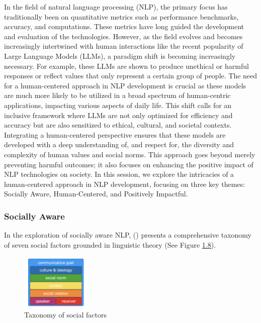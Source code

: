 \documentclass[
  letterpaper,
  DIV=11,
  numbers=noendperiod,
  oneside]{scrreprt}
\theoremstyle{remark}
\begin{document}
In the field of natural language processing (NLP), the primary focus has
traditionally been on quantitative metrics such as performance
benchmarks, accuracy, and computations. These metrics have long guided
the development and evaluation of the technologies. However, as the
field evolves and becomes increasingly intertwined with human
interactions like the recent popularity of Large Language Models (LLMs),
a paradigm shift is becoming increasingly necessary. For example, these
LLMs are shown to produce unethical or harmful responses or reflect
values that only represent a certain group of people. The need for a
human-centered approach in NLP development is crucial as these models
are much more likely to be utilized in a broad spectrum of human-centric
applications, impacting various aspects of daily life. This shift calls
for an inclusive framework where LLMs are not only optimized for
efficiency and accuracy but are also sensitized to ethical, cultural,
and societal contexts. Integrating a human-centered perspective ensures
that these models are developed with a deep understanding of, and
respect for, the diversity and complexity of human values and social
norms. This approach goes beyond merely preventing harmful outcomes; it
also focuses on enhancing the positive impact of NLP technologies on
society. In this session, we explore the intricacies of a human-centered
approach in NLP development, focusing on three key themes: Socially
Aware, Human-Centered, and Positively Impactful.

\subsubsection{Socially Aware}\label{socially-aware}

In the exploration of socially aware NLP,
() presents
a comprehensive taxonomy of seven social factors grounded in linguistic
theory (See Figure \hyperref[fig:taxonomy]{1.8}).

\begin{figure}

{\centering \includegraphics[width=0.3\textwidth,height=\textheight]{Figures/seven-taxonomy.png}

}

\caption{Taxonomy of social factors}

\end{figure}%
\end{document}
